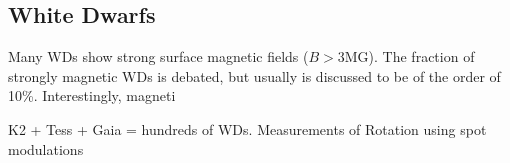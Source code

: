 {\color{red} \subsection{White Dwarfs}}
Many WDs show strong surface magnetic fields ($B>$3MG). The fraction of strongly magnetic WDs is debated, but usually is discussed to be of the order of 10\%. Interestingly, magneti 

K2 + Tess + Gaia = hundreds of WDs. Measurements of Rotation using spot modulations